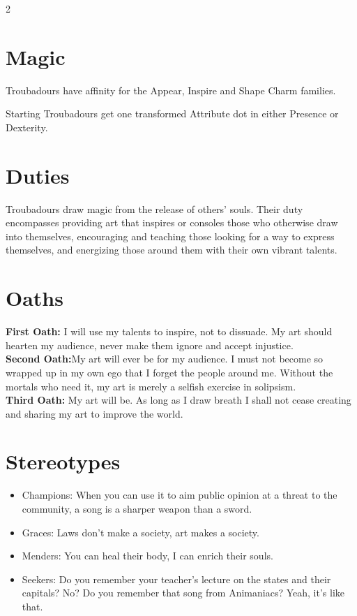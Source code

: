 \begin{multicols}{2}
\section*{Magic}
Troubadours have affinity for the Appear, Inspire and Shape Charm families.

Starting Troubadours get one transformed Attribute dot in either Presence or Dexterity. 

\section*{Duties}
Troubadours draw magic from the release of others' souls. Their duty encompasses providing art that inspires or consoles those who otherwise draw into themselves, encouraging and teaching those looking for a way to express themselves, and energizing those around them with their own vibrant talents. 
\section*{Oaths}
\noindent \textbf{First Oath:} I will use my talents to inspire, not to dissuade. My art should hearten my audience, never make them ignore and accept injustice. \\

\noindent \textbf{Second Oath:}My art will ever be for my audience. I must not become so wrapped up in my own ego that I forget the people around me. Without the mortals who need it, my art is merely a selfish exercise in solipsism. \\

\noindent \textbf{Third Oath:} My art will be. As long as I draw breath I shall not cease creating and sharing my art to improve the world.

\section*{Stereotypes}
\begin{itemize}
\item Champions: When you can use it to aim public opinion at a threat to the community, a song is a sharper weapon than a sword.
\item Graces: Laws don't make a society, art makes a society.
\item Menders: You can heal their body, I can enrich their souls.
\item Seekers: Do you remember your teacher's lecture on the states and their capitals? No? Do you remember that song from Animaniacs? Yeah, it's like that.
 

\end{itemize}
\end{multicols}
